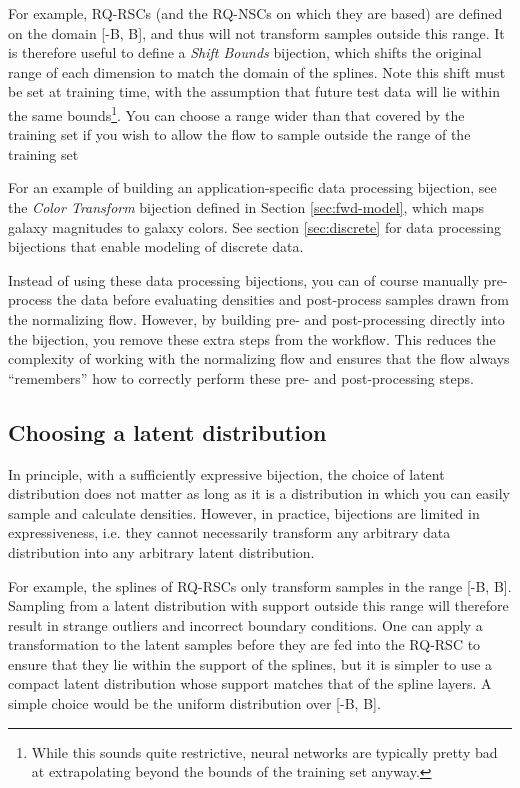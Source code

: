 \documentclass[twocolumn,twocolappendix]{aastex631}
\begin{document}
For example, RQ-RSCs (and the RQ-NSCs on which they are based) are defined on the domain [-B, B], and thus will not transform samples outside this range.
It is therefore useful to define a \emph{Shift Bounds} bijection, which shifts the original range of each dimension to match the domain of the splines.
Note this shift must be set at training time, with the assumption that future test data will lie within the same bounds\footnote{While this sounds quite restrictive, neural networks are typically pretty bad at extrapolating beyond the bounds of the training set anyway.}.
You can choose a range wider than that covered by the training set if you wish to allow the flow to sample outside the range of the training set

For an example of building an application-specific data processing bijection, see the \emph{Color Transform} bijection defined in Section \ref{sec:fwd-model}, which maps galaxy magnitudes to galaxy colors.
See section \ref{sec:discrete} for data processing bijections that enable modeling of discrete data.

Instead of using these data processing bijections, you can of course manually pre-process the data before evaluating densities and post-process samples drawn from the normalizing flow.
However, by building pre- and post-processing directly into the bijection, you remove these extra steps from the workflow.
This reduces the complexity of working with the normalizing flow and ensures that the flow always ``remembers'' how to correctly perform these pre- and post-processing steps.


\subsection{Choosing a latent distribution}
\label{sec:latent}

In principle, with a sufficiently expressive bijection, the choice of latent distribution does not matter as long as it is a distribution in which you can easily sample and calculate densities.
However, in practice, bijections are limited in expressiveness, i.e. they cannot necessarily transform any arbitrary data distribution into any arbitrary latent distribution.

For example, the splines of RQ-RSCs only transform samples in the range [-B, B].
Sampling from a latent distribution with support outside this range will therefore result in strange outliers and incorrect boundary conditions.
One can apply a transformation to the latent samples before they are fed into the RQ-RSC to ensure that they lie within the support of the splines, but it is simpler to use a compact latent distribution whose support matches that of the spline layers.
A simple choice would be the uniform distribution over [-B, B].
\end{document}
